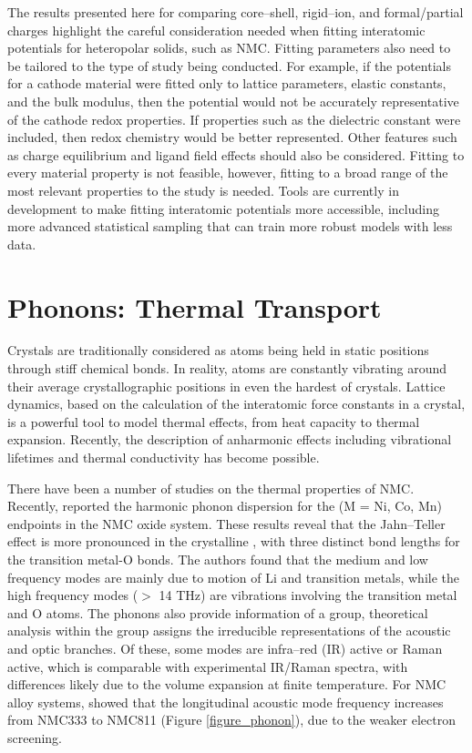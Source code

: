 \documentclass[journal=jacsat,manuscript=article]{achemso}
\begin{document}
The results presented here for comparing core--shell, rigid--ion, and formal/partial charges highlight the careful consideration needed when fitting interatomic potentials for heteropolar solids, such as NMC.
Fitting parameters also need to be tailored to the type of study being conducted.
For example, if the potentials for a cathode material were fitted only to lattice parameters, elastic constants, and the bulk modulus, then the potential would not be accurately representative of the cathode redox properties. 
If properties such as the dielectric constant were included, then redox chemistry would be better represented.
Other features such as charge equilibrium and ligand field effects should also be considered. 
Fitting to every material property is not feasible, however, fitting to a broad range of the most relevant properties to the study is needed. 
Tools are currently in development to make fitting interatomic potentials more accessible, including more advanced statistical sampling that can train more robust models with less data.\cite{gale_empirical_1996,Stukowski_2017,wen_kim-compliant_2017,Morgan2021PopOff}

\section*{Phonons: Thermal Transport}
Crystals are traditionally considered as atoms being held in static positions through stiff chemical bonds. 
In reality, atoms are constantly vibrating around their average crystallographic positions in even the hardest of crystals. 
Lattice dynamics, based on the calculation of the interatomic force constants in a crystal, is a powerful tool to model thermal effects, from heat capacity to thermal expansion.
Recently, the description of anharmonic effects including vibrational lifetimes and thermal conductivity has become possible.

There have been a number of studies on the thermal properties of NMC. 
Recently, \citeauthor{yang2020chemical} reported the harmonic phonon dispersion for the  (M = Ni, Co, Mn) endpoints in the NMC oxide system. \cite{yang2020chemical}
These results reveal that the Jahn--Teller effect is more pronounced in the crystalline , with three distinct bond lengths for the transition metal-O bonds.
The authors found that the medium and low frequency modes are mainly due to motion of Li and transition metals, while the high frequency modes ($>$ 14 THz) are vibrations involving the transition metal and O atoms.
The phonons also provide information of a group, theoretical analysis within the group assigns the irreducible representations of the acoustic and optic branches.
Of these, some modes are infra--red (IR) active or Raman active, which is comparable with experimental IR/Raman spectra, with differences likely due to the volume expansion at finite temperature.\cite{yang2019highly} 
For NMC alloy systems, \citeauthor{sun_electronic_2017} showed that the longitudinal acoustic mode frequency increases from NMC333 to NMC811 (Figure \ref{figure_phonon}), due to the weaker electron screening.\cite{sun_electronic_2017}
\end{document}
